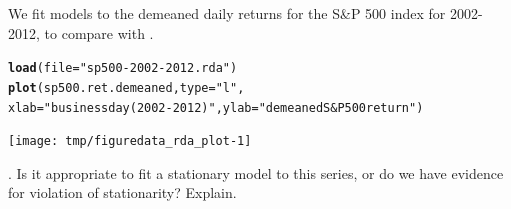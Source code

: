 \documentclass{beamer}\usepackage[]{graphicx}\usepackage[]{color}
\makeatletter
\newcommand{\hlstr}[1]{\textcolor[rgb]{0.192,0.494,0.8}{#1}}%
\newcommand{\hlstd}[1]{\textcolor[rgb]{0.345,0.345,0.345}{#1}}%
\newcommand{\hlkwc}[1]{\textcolor[rgb]{0.333,0.667,0.333}{#1}}%
\newcommand{\hlkwd}[1]{\textcolor[rgb]{0.737,0.353,0.396}{\textbf{#1}}}%
\newenvironment{kframe}{%
 \def\at@end@of@kframe{}%
 \ifinner\ifhmode%
  \def\at@end@of@kframe{\end{minipage}}%
  \begin{minipage}{\columnwidth}%
 \fi\fi%
 \def\FrameCommand##1{\hskip\@totalleftmargin \hskip-\fboxsep
 \colorbox{shadecolor}{##1}\hskip-\fboxsep
     \hskip-\linewidth \hskip-\@totalleftmargin \hskip\columnwidth}%
 \MakeFramed {\advance\hsize-\width
   \@totalleftmargin\z@ \linewidth\hsize
   \@setminipage}}%
 {\par\unskip\endMakeFramed%
 \at@end@of@kframe}
\newenvironment{knitrout}{}{} %
\newcommand\answer[2]{#1} %
\makeatother
\begin{document}
\begin{frame}[fragile]




\bi

\item We fit models to the demeaned daily returns for the S\&P 500 index for 2002-2012, to compare with \citet{breto14}. 

\vspace{-2mm}

\ei
\begin{knitrout}\small
{}\color{fgcolor}\begin{kframe}
\begin{alltt}
\hlkwd{load}\hlstd{(}\hlkwc{file}\hlstd{=}\hlstr{"sp500-2002-2012.rda"}\hlstd{)}
\hlkwd{plot}\hlstd{(sp500.ret.demeaned,} \hlkwc{type}\hlstd{=}\hlstr{"l"}\hlstd{,}
  \hlkwc{xlab}\hlstd{=}\hlstr{"business day (2002-2012)"}\hlstd{,}\hlkwc{ylab}\hlstd{=}\hlstr{"demeaned S&P 500 return"}\hlstd{)}
\end{alltt}
\end{kframe}
\end{knitrout}

\vspace{-2mm}

\begin{knitrout}\small
{}\color{fgcolor}

{\centering \texttt{[image: tmp/figuredata\_rda\_plot-1]} 

}



\end{knitrout}

\myquestion. Is it appropriate to fit a stationary model to this series, or do we have evidence for violation of stationarity? Explain.

\answer{\vspace{30mm}}{todo}

\end{frame}
\end{document}
